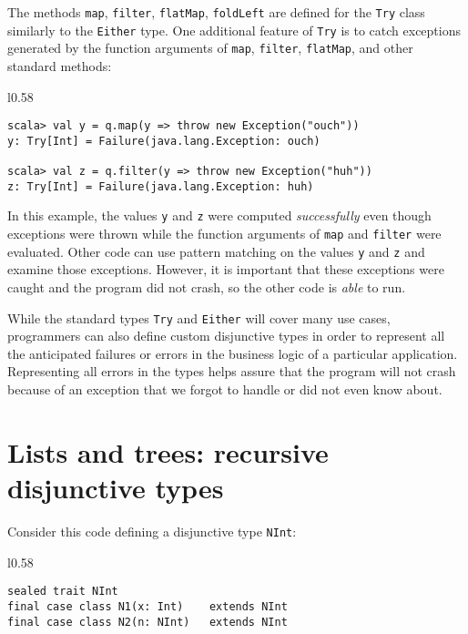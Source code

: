 The methods \lstinline!map!, \lstinline!filter!, \lstinline!flatMap!,
\lstinline!foldLeft! are defined for the \lstinline!Try! class similarly
to the \lstinline!Either! type. One additional feature of \lstinline!Try!
is to catch exceptions generated by the function arguments of \lstinline!map!,
\lstinline!filter!, \lstinline!flatMap!, and other standard methods:

\begin{wrapfigure}{l}{0.58\columnwidth}%
\vspace{-0.9\baselineskip}

\begin{lstlisting}
scala> val y = q.map(y => throw new Exception("ouch"))
y: Try[Int] = Failure(java.lang.Exception: ouch)

scala> val z = q.filter(y => throw new Exception("huh"))
z: Try[Int] = Failure(java.lang.Exception: huh)
\end{lstlisting}
\vspace{-0.9\baselineskip}
\end{wrapfigure}%

\noindent In this example, the values \lstinline!y! and \lstinline!z!
were computed \emph{successfully} even though exceptions were thrown
while the function arguments of \lstinline!map! and \lstinline!filter!
were evaluated. Other code can use pattern matching on the values
\lstinline!y! and \lstinline!z! and examine those exceptions. However,
it is important that these exceptions were caught and the program
did not crash, so the other code is \emph{able} to run. 

While the standard types \lstinline!Try! and \lstinline!Either!
will cover many use cases, programmers can also define custom disjunctive
types in order to represent all the anticipated failures or errors
in the business logic of a particular application. Representing all
errors in the types helps assure that the program will not crash because
of an exception that we forgot to handle or did not even know about.

\section{Lists and trees: recursive disjunctive types\label{sec:Lists-and-trees:recursive-disjunctive-types}}

Consider this code defining a disjunctive type \lstinline!NInt!:

\begin{wrapfigure}{l}{0.58\columnwidth}%
\vspace{-0.75\baselineskip}

\begin{lstlisting}
sealed trait NInt
final case class N1(x: Int)    extends NInt
final case class N2(n: NInt)   extends NInt
\end{lstlisting}
\vspace{-0.75\baselineskip}
\end{wrapfigure}%

